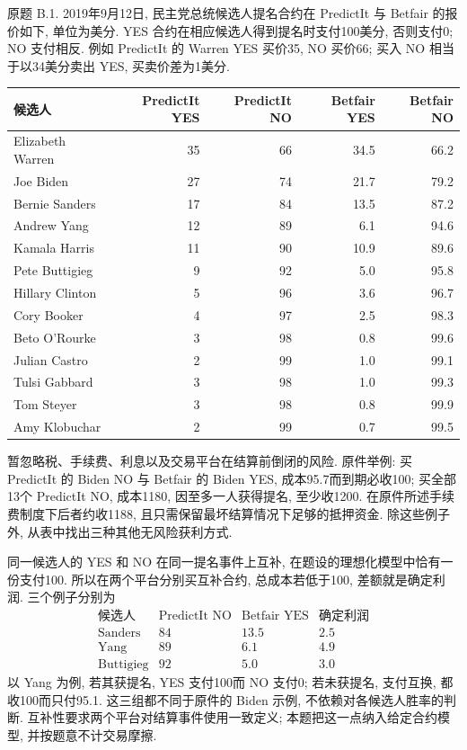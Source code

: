 \begin{exercise}\label{ps2-b1}
原题 B.1. 2019年9月12日, 民主党总统候选人提名合约在 PredictIt 与 Betfair 的报价如下, 单位为美分. YES 合约在相应候选人得到提名时支付100美分, 否则支付0; NO 支付相反. 例如 PredictIt 的 Warren YES 买价35, NO 买价66; 买入 NO 相当于以34美分卖出 YES, 买卖价差为1美分.
\begin{center}
\begin{tabular}{lrrrr}
\toprule
候选人 & PredictIt YES & PredictIt NO & Betfair YES & Betfair NO\\
\midrule
Elizabeth Warren&35&66&34.5&66.2\\
Joe Biden&27&74&21.7&79.2\\
Bernie Sanders&17&84&13.5&87.2\\
Andrew Yang&12&89&6.1&94.6\\
Kamala Harris&11&90&10.9&89.6\\
Pete Buttigieg&9&92&5.0&95.8\\
Hillary Clinton&5&96&3.6&96.7\\
Cory Booker&4&97&2.5&98.3\\
Beto O'Rourke&3&98&0.8&99.6\\
Julian Castro&2&99&1.0&99.1\\
Tulsi Gabbard&3&98&1.0&99.3\\
Tom Steyer&3&98&0.8&99.9\\
Amy Klobuchar&2&99&0.7&99.5\\
\bottomrule
\end{tabular}
\end{center}
暂忽略税、手续费、利息以及交易平台在结算前倒闭的风险. 原件举例: 买 PredictIt 的 Biden NO 与 Betfair 的 Biden YES, 成本95.7而到期必收100; 买全部13个 PredictIt NO, 成本1180, 因至多一人获得提名, 至少收1200. 在原件所述手续费制度下后者约收1188, 且只需保留最坏结算情况下足够的抵押资金. 除这些例子外, 从表中找出三种其他无风险获利方式.
\end{exercise}
\begin{solution}
同一候选人的 YES 和 NO 在同一提名事件上互补, 在题设的理想化模型中恰有一份支付100. 所以在两个平台分别买互补合约, 总成本若低于100, 差额就是确定利润. 三个例子分别为
\[
\begin{array}{c|c|c|c}
\text{候选人}&\text{PredictIt NO}&\text{Betfair YES}&\text{确定利润}\\\hline
\text{Sanders}&84&13.5&2.5\\
\text{Yang}&89&6.1&4.9\\
\text{Buttigieg}&92&5.0&3.0
\end{array}
\]
以 Yang 为例, 若其获提名, YES 支付100而 NO 支付0; 若未获提名, 支付互换, 都收100而只付95.1. 这三组都不同于原件的 Biden 示例, 不依赖对各候选人胜率的判断. 互补性要求两个平台对结算事件使用一致定义; 本题把这一点纳入给定合约模型, 并按题意不计交易摩擦.
\end{solution}

